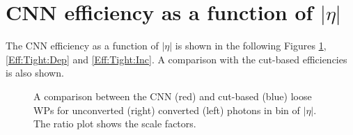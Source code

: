 \section{CNN efficiency as a function of $|\eta|$}
\label{Adx2:Eff:Eta}
The CNN efficiency as a function of $|\eta|$ is shown in the following Figures \ref{Eff:Loose}, \ref{Eff:Tight:Dep} and \ref{Eff:Tight:Inc}. A comparison with the cut-based efficiencies is also shown.  

\begin{figure}[htbp]
    \centering
	\begin{tcolorbox}[colback=black!5!white,colframe=white!75!black]
    \caption{A comparison between the CNN (red) and cut-based (blue) loose WPs for unconverted (right) converted (left) photons in bin of $|\eta|$. The ratio plot shows the scale factors.}
    \label{Eff:Loose}
    \end{tcolorbox}
    
\end{figure}

